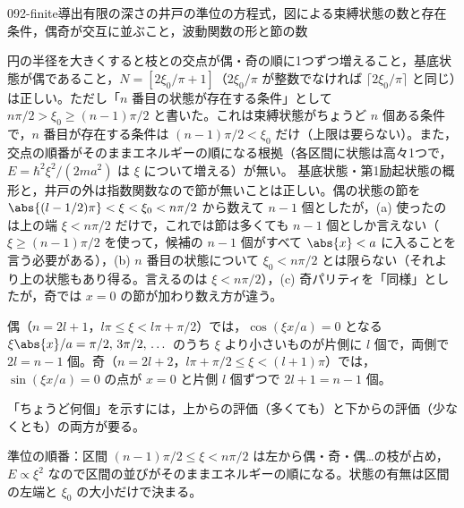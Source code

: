 \documentclass[uplatex,dvipdfmx,a4paper,11pt]{jsarticle}
\begin{document}
\begin{mondai}{092-finite}{導出}{有限の深さの井戸の準位の方程式，図による束縛状態の数と存在条件，偶奇が交互に並ぶこと，波動関数の形と節の数}
\begin{kotaeran}
   円の半径を大きくすると枝との交点が偶・奇の順に1つずつ増えること，基底状態が偶であること，$N=[2\xi_{0}/\pi+1]$（$2\xi_{0}/\pi$ が整数でなければ $\lceil 2\xi_{0}/\pi\rceil$ と同じ）は正しい。ただし「$n$ 番目の状態が存在する条件」として $n\pi/2>\xi_{0}\ge(n-1)\pi/2$ と書いた。これは束縛状態がちょうど $n$ 個ある条件で，$n$ 番目が存在する条件は $(n-1)\pi/2<\xi_{0}$ だけ（上限は要らない）。また，交点の順番がそのままエネルギーの順になる根拠（各区間に状態は高々1つで，$E=\hbar^{2}\xi^{2}/(2ma^{2})$ は $\xi$ について増える）が無い。
   基底状態・第1励起状態の概形と，井戸の外は指数関数なので節が無いことは正しい。偶の状態の節を $\abs{(l-1/2)\pi}<\xi<\xi_{0}<n\pi/2$ から数えて $n-1$ 個としたが，(a) 使ったのは上の端 $\xi<n\pi/2$ だけで，これでは節は多くても $n-1$ 個としか言えない（$\xi\ge(n-1)\pi/2$ を使って，候補の $n-1$ 個がすべて $\abs{x}<a$ に入ることを言う必要がある），(b) $n$ 番目の状態について $\xi_{0}<n\pi/2$ とは限らない（それより上の状態もあり得る。言えるのは $\xi<n\pi/2$），(c) 奇パリティを「同様」としたが，奇では $x=0$ の節が加わり数え方が違う。
\end{kotaeran}
\begin{rikai}
  \item 偶（$n=2l+1$，$l\pi\le\xi<l\pi+\pi/2$）では，$\cos(\xi x/a)=0$ となる $\xi\abs{x}/a=\pi/2,\,3\pi/2,\,\dots$ のうち $\xi$ より小さいものが片側に $l$ 個で，両側で $2l=n-1$ 個。奇（$n=2l+2$，$l\pi+\pi/2\le\xi<(l+1)\pi$）では，$\sin(\xi x/a)=0$ の点が $x=0$ と片側 $l$ 個ずつで $2l+1=n-1$ 個。
  \item 「ちょうど何個」を示すには，上からの評価（多くても）と下からの評価（少なくとも）の両方が要る。
  \item 準位の順番：区間 $(n-1)\pi/2\le\xi<n\pi/2$ は左から偶・奇・偶…の枝が占め，$E\propto\xi^{2}$ なので区間の並びがそのままエネルギーの順になる。状態の有無は区間の左端と $\xi_{0}$ の大小だけで決まる。
\end{rikai}
\end{mondai}
\end{document}

